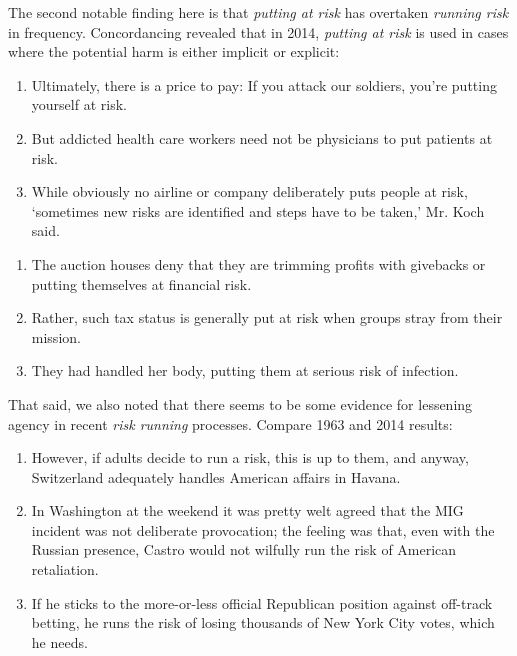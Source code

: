     The second notable finding here is that \emph{putting at risk} has overtaken \emph{running risk} in frequency. Concordancing revealed that in 2014, \emph{putting at risk} is used in cases where the potential harm is either implicit or explicit:

    \begin{enumerate}  [before=\itshape,font=\normalfont] \setlength\itemsep{0em} \small
    \item Ultimately, there is a price to pay: If you attack our soldiers, you're putting yourself at risk.
    \item But addicted health care workers need not be physicians to put patients at risk.
    \item While obviously no airline or company deliberately puts people at risk, `sometimes new risks are identified and steps have to be taken,' Mr. Koch said.
    \end{enumerate}

    \begin{enumerate}  [before=\itshape,font=\normalfont] \setlength\itemsep{0em} \small
    \item The auction houses deny that they are trimming profits with givebacks or putting themselves at financial risk.
    \item Rather, such tax status is generally put at risk when groups stray from their mission.
    \item They had handled her body, putting them at serious risk of infection.
    \end{enumerate}

    That said, we also noted that there seems to be some evidence for lessening agency in recent \emph{risk running} processes. Compare 1963 and 2014 results:

    \begin{enumerate} [before=\itshape,font=\normalfont]  \setlength\itemsep{0em} \small
    \item However, if adults decide to run a risk, this is up to them, and anyway, Switzerland adequately handles American affairs in Havana.
    \item In Washington at the weekend it was pretty welt agreed that the MIG incident was not deliberate provocation; the feeling was that, even with the Russian presence, Castro would not wilfully run the risk of American retaliation.
    \item  If he sticks to the more-or-less official Republican position against off-track betting, he runs the risk of losing thousands of New York City votes, which he needs.
    \end{enumerate}

